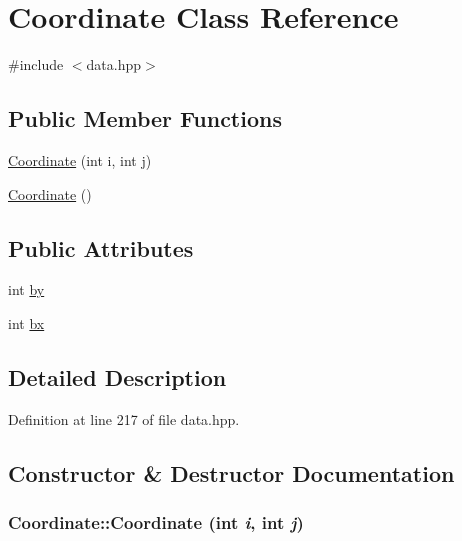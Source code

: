 \hypertarget{class_coordinate}{
\section{Coordinate Class Reference}
\label{class_coordinate}
}


{\ttfamily \#include $<$data.hpp$>$}\subsection*{Public Member Functions}
\begin{DoxyCompactItemize}
\item 
\hyperlink{class_coordinate_a49f49e14488f2f58c2591974553b7c8a}{Coordinate} (int i, int j)
\item 
\hyperlink{class_coordinate_aac6f323a685fc1e88fbea9c86f1e600d}{Coordinate} ()
\end{DoxyCompactItemize}
\subsection*{Public Attributes}
\begin{DoxyCompactItemize}
\item 
int \hyperlink{class_coordinate_a8e844a4d3fe7c4c960152801e9e08472}{by}
\item 
int \hyperlink{class_coordinate_a0c9dfb8c2c3a73068bd02603ef7b3a33}{bx}
\end{DoxyCompactItemize}


\subsection{Detailed Description}


Definition at line 217 of file data.hpp.

\subsection{Constructor \& Destructor Documentation}
\hypertarget{class_coordinate_a49f49e14488f2f58c2591974553b7c8a}{
\subsubsection[{Coordinate}]{\setlength{\rightskip}{0pt plus 5cm}Coordinate::Coordinate (int {\em i}, \/  int {\em j})}}
\label{class_coordinate_a49f49e14488f2f58c2591974553b7c8a}



